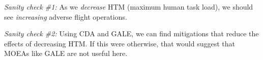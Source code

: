 \documentclass[journal]{IEEEtran}
\begin{document}
{\em Sanity check \#1:}
 As we 
{\em decrease}
HTM (maximum human task load), we should see {\em increasing} adverse flight operations. 

{\em Sanity check \#2:} Using CDA and GALE, we can find mitigations that reduce the effects of decreasing HTM. 
If this were otherwise, that would suggest that MOEAs like GALE are not useful here.





\end{document}
